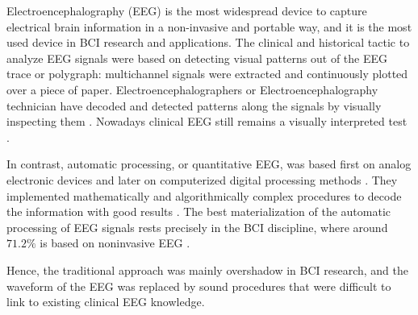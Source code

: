 

Electroencephalography (EEG) is the most widespread device to capture electrical brain information in a non-invasive and portable way, and it is the most used device in BCI research and applications.  The clinical and historical tactic to analyze EEG signals were based on detecting visual patterns out of the EEG trace or polygraph\cite{Hartman2005}: multichannel signals were extracted and continuously plotted over a piece of paper. Electroencephalographers or Electroencephalography technician have decoded and detected patterns along the signals by visually inspecting them \cite{Schomer2010}.   Nowadays clinical EEG still remains a visually interpreted test \cite{Hartman2005}.

In contrast, automatic processing, or quantitative EEG, was based first on analog electronic devices and later on computerized digital processing methods \cite{Jansen1991}.  They implemented mathematically and algorithmically complex procedures to decode the information with good results \cite{Yuste2017}.  The best materialization of the automatic processing of EEG signals rests precisely in the BCI discipline, where around $71.2\%$ is based on noninvasive EEG \cite{Guger2017}.  


Hence, the traditional  approach was mainly overshadow in BCI research, and the waveform of the EEG was replaced by sound procedures that were difficult to link to existing clinical EEG knowledge.  


